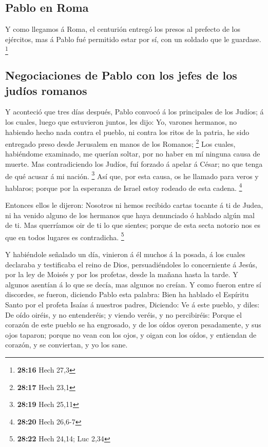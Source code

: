 \hypertarget{pablo-en-roma}{%
\subsection{Pablo en Roma}\label{pablo-en-roma}}

 Y como llegamos á Roma, el centurión entregó los presos al
prefecto de los ejércitos, mas á Pablo fué permitido estar por sí, con
un soldado que le guardase. \footnote{\textbf{28:16} Hech 27,3}

\hypertarget{negociaciones-de-pablo-con-los-jefes-de-los-juduxedos-romanos}{%
\subsection{Negociaciones de Pablo con los jefes de los judíos
romanos}\label{negociaciones-de-pablo-con-los-jefes-de-los-juduxedos-romanos}}

 Y aconteció que tres días después, Pablo convocó á los
principales de los Judíos; á los cuales, luego que estuvieron juntos,
les dijo: Yo, varones hermanos, no habiendo hecho nada contra el pueblo,
ni contra los ritos de la patria, he sido entregado preso desde
Jerusalem en manos de los Romanos; \footnote{\textbf{28:17} Hech 23,1}
 Los cuales, habiéndome examinado, me querían soltar, por
no haber en mí ninguna causa de muerte.  Mas contradiciendo
los Judíos, fuí forzado á apelar á César; no que tenga de qué acusar á
mi nación. \footnote{\textbf{28:19} Hech 25,11}  Así que,
por esta causa, os he llamado para veros y hablaros; porque por la
esperanza de Israel estoy rodeado de esta cadena. \footnote{\textbf{28:20}
  Hech 26,6-7}

 Entonces ellos le dijeron: Nosotros ni hemos recibido
cartas tocante á ti de Judea, ni ha venido alguno de los hermanos que
haya denunciado ó hablado algún mal de ti.  Mas querríamos
oir de ti lo que sientes; porque de esta secta notorio nos es que en
todos lugares es contradicha. \footnote{\textbf{28:22} Hech 24,14; Luc
  2,34}

 Y habiéndole señalado un día, vinieron á él muchos á la
posada, á los cuales declaraba y testificaba el reino de Dios,
persuadiéndoles lo concerniente á Jesús, por la ley de Moisés y por los
profetas, desde la mañana hasta la tarde.  Y algunos
asentían á lo que se decía, mas algunos no creían.  Y como
fueron entre sí discordes, se fueron, diciendo Pablo esta palabra: Bien
ha hablado el Espíritu Santo por el profeta Isaías á nuestros padres,
 Diciendo: Ve á este pueblo, y diles: De oído oiréis, y no
entenderéis; y viendo veréis, y no percibiréis:  Porque el
corazón de este pueblo se ha engrosado, y de los oídos oyeron
pesadamente, y sus ojos taparon; porque no vean con los ojos, y oigan
con los oídos, y entiendan de corazón, y se conviertan, y yo los sane.

